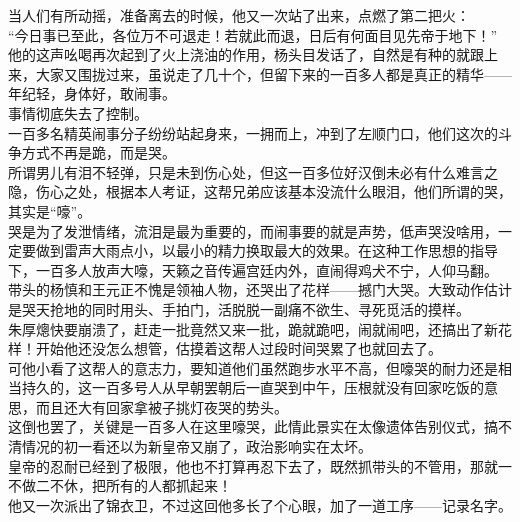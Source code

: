 \begin{multicols}{\theparacolNo}
当人们有所动摇，准备离去的时候，他又一次站了出来，点燃了第二把火：\\

“今日事已至此，各位万不可退走！若就此而退，日后有何面目见先帝于地下！”\\

他的这声吆喝再次起到了火上浇油的作用，杨头目发话了，自然是有种的就跟上来，大家又围拢过来，虽说走了几十个，但留下来的一百多人都是真正的精华——年纪轻，身体好，敢闹事。\\

事情彻底失去了控制。\\

一百多名精英闹事分子纷纷站起身来，一拥而上，冲到了左顺门口，他们这次的斗争方式不再是跪，而是哭。\\

所谓男儿有泪不轻弹，只是未到伤心处，但这一百多位好汉倒未必有什么难言之隐，伤心之处，根据本人考证，这帮兄弟应该基本没流什么眼泪，他们所谓的哭，其实是“嚎”。\\

哭是为了发泄情绪，流泪是最为重要的，而闹事要的就是声势，低声哭没啥用，一定要做到雷声大雨点小，以最小的精力换取最大的效果。在这种工作思想的指导下，一百多人放声大嚎，天籁之音传遍宫廷内外，直闹得鸡犬不宁，人仰马翻。\\

带头的杨慎和王元正不愧是领袖人物，还哭出了花样——撼门大哭。大致动作估计是哭天抢地的同时用头、手拍门，活脱脱一副痛不欲生、寻死觅活的摸样。\\

朱厚熜快要崩溃了，赶走一批竟然又来一批，跪就跪吧，闹就闹吧，还搞出了新花样！开始他还没怎么想管，估摸着这帮人过段时间哭累了也就回去了。\\

可他小看了这帮人的意志力，要知道他们虽然跑步水平不高，但嚎哭的耐力还是相当持久的，这一百多号人从早朝罢朝后一直哭到中午，压根就没有回家吃饭的意思，而且还大有回家拿被子挑灯夜哭的势头。\\

这倒也罢了，关键是一百多人在这里嚎哭，此情此景实在太像遗体告别仪式，搞不清情况的初一看还以为新皇帝又崩了，政治影响实在太坏。\\

皇帝的忍耐已经到了极限，他也不打算再忍下去了，既然抓带头的不管用，那就一不做二不休，把所有的人都抓起来！\\

他又一次派出了锦衣卫，不过这回他多长了个心眼，加了一道工序——记录名字。\\


\end{multicols}
